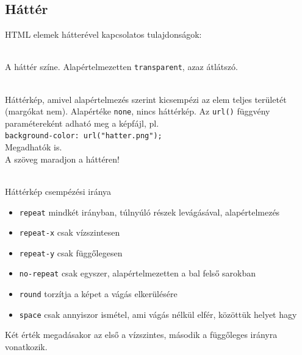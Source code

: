 \subsection{Háttér}

\begin{frame}
  HTML elemek hátterével kapcsolatos tulajdonságok:
  \begin{description}[m]
    \item[\texttt{background-color}] \hfill \\ A háttér színe. 
    Alapértelmezetten \texttt{transparent}, azaz átlátszó.
    \item[\texttt{background-image}] \hfill \\ Háttérkép, amivel 
    alapértelmezés szerint kicsempézi az elem teljes területét 
    (margókat nem). 
    Alapértéke \texttt{none}, nincs háttérkép. Az \texttt{url()} 
    függvény paramétereként adható meg a képfájl, pl. \\
    \texttt{background-color: url("hatter.png");} \\Megadhatók 
     is.\\
    A szöveg maradjon  a háttéren!
  \end{description}
\end{frame}

\begin{frame}
  \begin{description}[m]
    \item[\texttt{background-repeat}] \hfill \\ Háttérkép 
    csempézési iránya
    \begin{itemize}
      \item \texttt{repeat} mindkét irányban, túlnyúló részek 
      levágásával, alapértelmezés
      \item \texttt{repeat-x} csak vízszintesen
      \item \texttt{repeat-y} csak függőlegesen
      \item \texttt{no-repeat} csak egyszer, alapértelmezetten a bal 
      felső sarokban
      \item \texttt{round} torzítja a képet a vágás elkerülésére
      \item \texttt{space} csak annyiszor ismétel, ami vágás 
      nélkül elfér, közöttük helyet hagy
    \end{itemize}
    Két érték megadásakor az első a vízszintes, második a 
    függőleges irányra vonatkozik.
  \end{description}
\end{frame}

